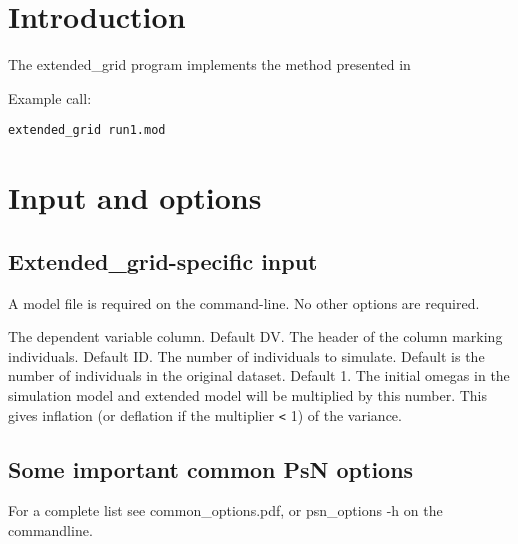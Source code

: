 




\maketitle
\newcommand{\guidetoolname}{extended\_grid}


\section{Introduction}
The extended\_grid program implements the method presented in \cite{Savic}

Example call:
\begin{verbatim}
extended_grid run1.mod
\end{verbatim}

\section{Input and options}

\subsection{Extended\_grid-specific input}

A model file is required on the command-line. No other options are required.

\begin{optionlist}
The dependent variable column. Default DV. 
\nextopt
{}
The header of the column marking individuals. Default ID. 
\nextopt
{}
The number of individuals to simulate. Default is the number of individuals in the original dataset. 
\nextopt
{}
Default 1. The initial omegas in the simulation model and extended model will be multiplied by this number. 
This gives inflation (or deflation if the multiplier \verb|<| 1) of the variance. 
\nextopt
\end{optionlist}

\subsection{Some important common PsN options}
For a complete list see common\_options.pdf, 
or psn\_options -h on the commandline.


